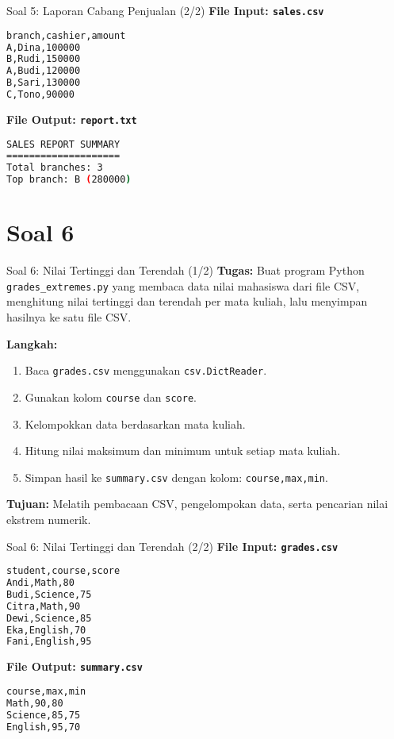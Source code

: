 \documentclass[aspectratio=169, table]{beamer}
\begin{document}
\begin{frame}[fragile]{Soal 5: Laporan Cabang Penjualan (2/2)}
\vspace{15pt}
\textbf{File Input: \texttt{sales.csv}}
\begin{lstlisting}[language=bash,basicstyle=\ttfamily\small]
branch,cashier,amount
A,Dina,100000
B,Rudi,150000
A,Budi,120000
B,Sari,130000
C,Tono,90000
\end{lstlisting}

\textbf{File Output: \texttt{report.txt}}
\begin{lstlisting}[language=bash,basicstyle=\ttfamily\small]
SALES REPORT SUMMARY
====================
Total branches: 3
Top branch: B (280000)
\end{lstlisting}
\end{frame}

\section{Soal 6}
\begin{frame}[fragile]{Soal 6: Nilai Tertinggi dan Terendah (1/2)}
\vspace{15pt}
\textbf{Tugas:}  
Buat program Python \texttt{grades\_extremes.py} yang membaca data nilai mahasiswa dari file CSV, menghitung nilai tertinggi dan terendah per mata kuliah, lalu menyimpan hasilnya ke satu file CSV.

\textbf{Langkah:}
\begin{enumerate}
  \item Baca \texttt{grades.csv} menggunakan \texttt{csv.DictReader}.
  \item Gunakan kolom \texttt{course} dan \texttt{score}.
  \item Kelompokkan data berdasarkan mata kuliah.
  \item Hitung nilai maksimum dan minimum untuk setiap mata kuliah.
  \item Simpan hasil ke \texttt{summary.csv}  
        dengan kolom: \texttt{course,max,min}.
\end{enumerate}

\textbf{Tujuan:}  
Melatih pembacaan CSV, pengelompokan data, serta pencarian nilai ekstrem numerik.
\end{frame}

\begin{frame}[fragile]{Soal 6: Nilai Tertinggi dan Terendah (2/2)}
\vspace{15pt}
\textbf{File Input: \texttt{grades.csv}}
\begin{lstlisting}[language=bash,basicstyle=\ttfamily\small]
student,course,score
Andi,Math,80
Budi,Science,75
Citra,Math,90
Dewi,Science,85
Eka,English,70
Fani,English,95
\end{lstlisting}

\textbf{File Output: \texttt{summary.csv}}
\begin{lstlisting}[language=bash,basicstyle=\ttfamily\small]
course,max,min
Math,90,80
Science,85,75
English,95,70
\end{lstlisting}
\end{frame}
\end{document}

